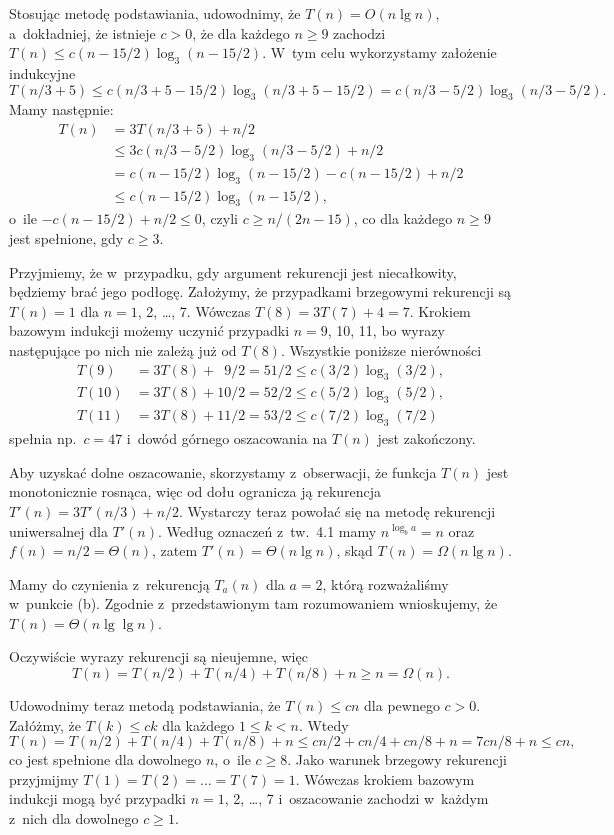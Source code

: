 \subproblem %
Stosując metodę podstawiania, udowodnimy, że $T(n)=O(n\lg n)$, a~dokładniej, że istnieje $c>0$, że dla każdego $n\ge9$ zachodzi $T(n)\le c(n-15/2)\log_3(n-15/2)$.
W~tym celu wykorzystamy założenie indukcyjne
\[
	T(n/3+5) \le c(n/3+5-15/2)\log_3(n/3+5-15/2) = c(n/3-5/2)\log_3(n/3-5/2).
\]
Mamy następnie:
\begin{align*}
	T(n) &= 3T(n/3+5)+n/2 \\
	&\le 3c(n/3-5/2)\log_3(n/3-5/2)+n/2 \\
	&= c(n-15/2)\log_3(n-15/2)-c(n-15/2)+n/2 \\
	&\le c(n-15/2)\log_3(n-15/2),
\end{align*}
o~ile $-c(n-15/2)+n/2\le0$, czyli $c\ge n/(2n-15)$, co dla każdego $n\ge9$ jest spełnione, gdy $c\ge3$.

Przyjmiemy, że w~przypadku, gdy argument rekurencji jest niecałkowity, będziemy brać jego podłogę.
Założymy, że przypadkami brzegowymi rekurencji są $T(n)=1$ dla $n=1$, 2, \dots, 7.
Wówczas $T(8)=3T(7)+4=7$.
Krokiem bazowym indukcji możemy uczynić przypadki $n=9$, 10, 11, bo wyrazy następujące po nich nie zależą już od $T(8)$.
Wszystkie poniższe nierówności
\begin{align*}
	T(9) &= 3T(8)+\phantom{1}9/2 = 51/2 \le c(3/2)\log_3(3/2), \\
	T(10) &= 3T(8)+10/2 = 52/2 \le c(5/2)\log_3(5/2), \\
	T(11) &= 3T(8)+11/2 = 53/2 \le c(7/2)\log_3(7/2)
\end{align*}
spełnia np.\ $c=47$ i~dowód górnego oszacowania na $T(n)$ jest zakończony.

Aby uzyskać dolne oszacowanie, skorzystamy z~obserwacji, że funkcja $T(n)$ jest monotonicznie rosnąca, więc od dołu ogranicza ją rekurencja $T'(n)=3T'(n/3)+n/2$.
Wystarczy teraz powołać się na metodę rekurencji uniwersalnej dla $T'(n)$.
Według oznaczeń z~tw.\ 4.1 mamy $n^{\log_ba}=n$ oraz $f(n)=n/2=\Theta(n)$, zatem $T'(n)=\Theta(n\lg n)$, skąd $T(n)=\Omega(n\lg n)$.

\subproblem %
Mamy do czynienia z~rekurencją $T_a(n)$ dla $a=2$, którą rozważaliśmy w~punkcie (b).
Zgodnie z~przedstawionym tam rozumowaniem wnioskujemy, że $T(n)=\Theta(n\lg\lg n)$.

\subproblem %
Oczywiście wyrazy rekurencji są nieujemne, więc
\[
	T(n) = T(n/2)+T(n/4)+T(n/8)+n \ge n = \Omega(n).
\]

Udowodnimy teraz metodą podstawiania, że $T(n)\le cn$ dla pewnego $c>0$.
Załóżmy, że $T(k)\le ck$ dla każdego $1\le k<n$.
Wtedy
\[
	T(n) = T(n/2)+T(n/4)+T(n/8)+n \le cn/2+cn/4+cn/8+n = 7cn/8+n \le cn,
\]
co jest spełnione dla dowolnego $n$, o~ile $c\ge8$.
Jako warunek brzegowy rekurencji przyjmijmy $T(1)=T(2)=\dots=T(7)=1$.
Wówczas krokiem bazowym indukcji mogą być przypadki $n=1$, 2, \dots, 7 i~oszacowanie zachodzi w~każdym z~nich dla dowolnego $c\ge1$.

